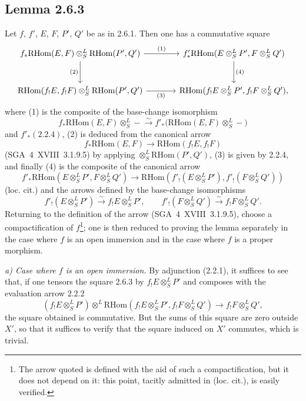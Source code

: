 \documentclass[11pt]{article}
\providecommand{\RHom}{\mathrm{RHom}}
\begin{document}
\subsection*{Lemma 2.6.3}
Let $f$, $f'$, $E$, $F$, $P'$, $Q'$ be as in 2.6.1. Then one has a commutative square
\[
\begin{tikzcd}[column sep=large,row sep=large]
f_*\RHom(E,F)\otimes^L_S\RHom(P',Q') \arrow[r,"(1)"] \arrow[d,"(2)"'] & f'_*\RHom(E\otimes^L_SP',F\otimes^L_SQ') \arrow[d,"(4)"]\\
\RHom(f_!E,f_!F)\otimes^L_S\RHom(P',Q') \arrow[r,"(3)"'] & \RHom(f_!E\otimes^L_SP',f_!F\otimes^L_SQ'),
\end{tikzcd}
\]
where (1) is the composite of the base-change isomorphism
\[
f_*\RHom(E,F)\otimes^L_S -\xrightarrow{\sim}f'_*\bigl(\RHom(E,F)\otimes^L_S-\bigr)
\]
and $f'_*(2.2.4)$, (2) is deduced from the canonical arrow
\[
f_*\RHom(E,F)\longrightarrow\RHom(f_!E,f_!F)
\]
(SGA~4~XVIII~3.1.9.5) by applying $\otimes^L_S\RHom(P',Q')$, (3) is given by 2.2.4, and finally (4) is the composite of the canonical arrow
\[
f'_*\RHom(E\otimes^L_SP',F\otimes^L_SQ')
\longrightarrow
\RHom(f'_!(E\otimes^L_SP'),f'_!(F\otimes^L_SQ'))
\]
(loc. cit.) and the arrows defined by the base-change isomorphisms
\[
f'_!(E\otimes^L_SP')\xrightarrow{\sim}f_!E\otimes^L_SP',
\qquad
f'_!(F\otimes^L_SQ')\xrightarrow{\sim}f_!F\otimes^L_SQ'.
\]
Returning to the definition of the arrow (SGA~4~XVIII~3.1.9.5), choose a compactification of $f$\footnote{The arrow quoted is defined with the aid of such a compactification, but it does not depend on it: this point, tacitly admitted in (loc. cit.), is easily verified.}; one is then reduced to proving the lemma separately in the case where $f$ is an open immersion and in the case where $f$ is a proper morphism.

\emph{a) Case where $f$ is an open immersion.} By adjunction (2.2.1), it suffices to see that, if one tensors the square 2.6.3 by $f_!E\otimes^L_SP'$ and composes with the evaluation arrow 2.2.2
\[
(f_!E\otimes^L_SP')\otimes^L\RHom(f_!E\otimes^L_SP',f_!F\otimes^L_SQ')\longrightarrow f_!F\otimes^L_SQ',
\]
the square obtained is commutative. But the sums of this square are zero outside $X'$, so that it suffices to verify that the square induced on $X'$ commutes, which is trivial.
\end{document}
